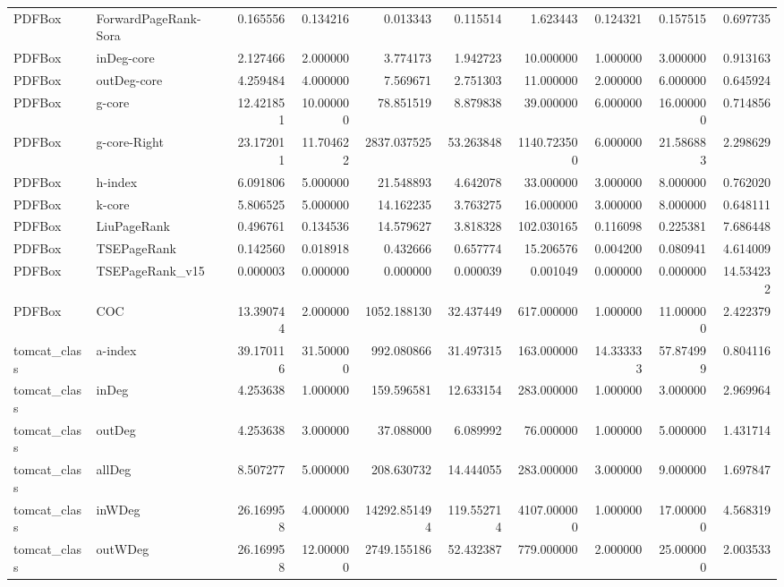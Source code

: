 \begin{tabular}{llrrrrrrrr}
PDFBox & ForwardPageRank-Sora & 0.165556 & 0.134216 & 0.013343 & 0.115514 & 1.623443 & 0.124321 & 0.157515 & 0.697735 \\
PDFBox & inDeg-core & 2.127466 & 2.000000 & 3.774173 & 1.942723 & 10.000000 & 1.000000 & 3.000000 & 0.913163 \\
PDFBox & outDeg-core & 4.259484 & 4.000000 & 7.569671 & 2.751303 & 11.000000 & 2.000000 & 6.000000 & 0.645924 \\
PDFBox & g-core & 12.421851 & 10.000000 & 78.851519 & 8.879838 & 39.000000 & 6.000000 & 16.000000 & 0.714856 \\
PDFBox & g-core-Right & 23.172011 & 11.704622 & 2837.037525 & 53.263848 & 1140.723500 & 6.000000 & 21.586883 & 2.298629 \\
PDFBox & h-index & 6.091806 & 5.000000 & 21.548893 & 4.642078 & 33.000000 & 3.000000 & 8.000000 & 0.762020 \\
PDFBox & k-core & 5.806525 & 5.000000 & 14.162235 & 3.763275 & 16.000000 & 3.000000 & 8.000000 & 0.648111 \\
PDFBox & LiuPageRank & 0.496761 & 0.134536 & 14.579627 & 3.818328 & 102.030165 & 0.116098 & 0.225381 & 7.686448 \\
PDFBox & TSEPageRank & 0.142560 & 0.018918 & 0.432666 & 0.657774 & 15.206576 & 0.004200 & 0.080941 & 4.614009 \\
PDFBox & TSEPageRank_v15 & 0.000003 & 0.000000 & 0.000000 & 0.000039 & 0.001049 & 0.000000 & 0.000000 & 14.534232 \\
PDFBox & COC & 13.390744 & 2.000000 & 1052.188130 & 32.437449 & 617.000000 & 1.000000 & 11.000000 & 2.422379 \\
tomcat_class & a-index & 39.170116 & 31.500000 & 992.080866 & 31.497315 & 163.000000 & 14.333333 & 57.874999 & 0.804116 \\
tomcat_class & inDeg & 4.253638 & 1.000000 & 159.596581 & 12.633154 & 283.000000 & 1.000000 & 3.000000 & 2.969964 \\
tomcat_class & outDeg & 4.253638 & 3.000000 & 37.088000 & 6.089992 & 76.000000 & 1.000000 & 5.000000 & 1.431714 \\
tomcat_class & allDeg & 8.507277 & 5.000000 & 208.630732 & 14.444055 & 283.000000 & 3.000000 & 9.000000 & 1.697847 \\
tomcat_class & inWDeg & 26.169958 & 4.000000 & 14292.851494 & 119.552714 & 4107.000000 & 1.000000 & 17.000000 & 4.568319 \\
tomcat_class & outWDeg & 26.169958 & 12.000000 & 2749.155186 & 52.432387 & 779.000000 & 2.000000 & 25.000000 & 2.003533 \\

\end{tabular}
